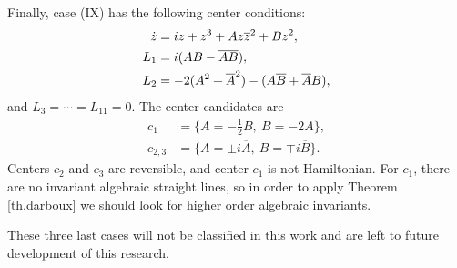 Finally, case (IX) has the following center conditions:
\begin{align*}
\dot z &= iz + z^3+Az\overline{z}^2+Bz^2,\\
L_1 &=i(AB-\overline A\overline B),\\
L_2 &=-2(A^2+\overline A^2)-(A\overline B+\overline AB),
\end{align*}
and $L_3=\cdots=L_{11}=0$. The center candidates are
\begin{align*}
c_1 &= \{A=-\frac{1}{2}\overline B,~B=-2\overline A\},\\
c_{2,3} &= \{A=\pm i\overline A,~B=\mp i\overline B\}.
\end{align*}
Centers $c_2$ and $c_3$ are reversible, and center $c_1$ is not Hamiltonian. For $c_1$, there are no invariant algebraic straight lines, so in order to apply Theorem \ref{th.darboux} we should look for higher order algebraic invariants.

These three last cases will not be classified in this work and are left to future development of this research.


